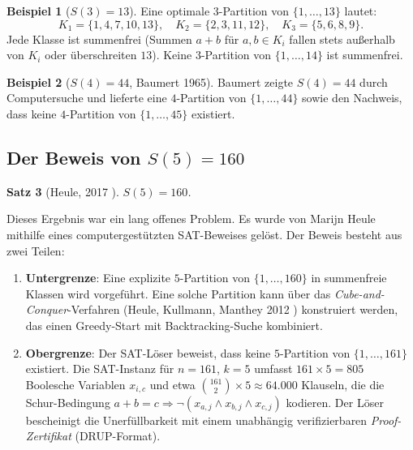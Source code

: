 \documentclass[12pt,a4paper]{amsart}
\newtheorem{theorem}{Satz}[section]
\theoremstyle{definition}
\newtheorem{example}[theorem]{Beispiel}
\begin{document}
\begin{example}[$S(3) = 13$]
Eine optimale $3$-Partition von $\{1,\ldots,13\}$ lautet:
\[
  K_1 = \{1,4,7,10,13\}, \quad K_2 = \{2,3,11,12\}, \quad K_3 = \{5,6,8,9\}.
\]
Jede Klasse ist summenfrei (Summen $a+b$ für $a,b \in K_i$ fallen stets außerhalb von
$K_i$ oder überschreiten $13$). Keine $3$-Partition von $\{1,\ldots,14\}$ ist summenfrei.
\end{example}

\begin{example}[$S(4) = 44$, Baumert 1965]
Baumert \cite{Baumert1965} zeigte $S(4) = 44$ durch Computersuche und lieferte
eine $4$-Partition von $\{1,\ldots,44\}$ sowie den Nachweis, dass keine
$4$-Partition von $\{1,\ldots,45\}$ existiert.
\end{example}

\subsection{Der Beweis von \texorpdfstring{$S(5) = 160$}{S(5) = 160}}

\begin{theorem}[Heule, 2017 \cite{Heule2017}]\label{satz:s5}
$S(5) = 160$.
\end{theorem}

Dieses Ergebnis war ein lang offenes Problem. Es wurde von Marijn Heule mithilfe
eines computergestützten SAT-Beweises gelöst. Der Beweis besteht aus zwei Teilen:

\begin{enumerate}[label=(\roman*)]
\item \textbf{Untergrenze}: Eine explizite $5$-Partition von $\{1,\ldots,160\}$ in
  summenfreie Klassen wird vorgeführt. Eine solche Partition kann über das
  \emph{Cube-and-Conquer}-Verfahren (Heule, Kullmann, Manthey 2012
  \cite{HeuleKullmannManthey2012}) konstruiert werden, das einen Greedy-Start
  mit Backtracking-Suche kombiniert.

\item \textbf{Obergrenze}: Der SAT-Löser beweist, dass keine $5$-Partition von
  $\{1,\ldots,161\}$ existiert. Die SAT-Instanz für $n = 161$, $k = 5$ umfasst
  $161 \times 5 = 805$ Boolesche Variablen $x_{i,c}$ und etwa
  $\binom{161}{2} \times 5 \approx 64{.}000$ Klauseln, die die Schur-Bedingung
  $a + b = c \Rightarrow \neg(x_{a,j} \wedge x_{b,j} \wedge x_{c,j})$ kodieren.
  Der Löser bescheinigt die Unerfüllbarkeit mit einem unabhängig verifizierbaren
  \emph{Proof-Zertifikat} (DRUP-Format).
\end{enumerate}
\end{document}
